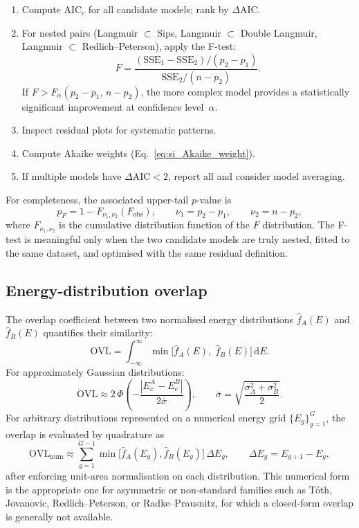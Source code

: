 \documentclass[journal=jacsat,manuscript=article]{achemso}
\begin{document}
\begin{enumerate}
	\item Compute AIC$_c$ for all candidate models; rank by $\Delta$AIC.
	\item For nested pairs (Langmuir $\subset$ Sips, Langmuir
	$\subset$ Double Langmuir, Langmuir $\subset$ Redlich--Peterson),
	apply the F-test:
	\begin{equation}
		F = \frac{(\mathrm{SSE}_1 - \mathrm{SSE}_2)/(p_2 - p_1)}
		{\mathrm{SSE}_2/(n - p_2)}.
		\label{eq:si_Ftest}
	\end{equation}
	If $F > F_{\alpha}(p_2 - p_1,\, n - p_2)$, the more complex model
	provides a statistically significant improvement at confidence
	level~$\alpha$.
	\item Inspect residual plots for systematic patterns.
	\item Compute Akaike weights (Eq.~\ref{eq:si_Akaike_weight}).
	\item If multiple models have $\Delta\mathrm{AIC} < 2$,
	report all and consider model averaging.
\end{enumerate}
For completeness, the associated upper-tail $p$-value is
\begin{equation}
	p_F
	=
	1 - F_{\nu_1,\nu_2}(F_{\mathrm{obs}}),
	\qquad
	\nu_1 = p_2 - p_1,
	\qquad
	\nu_2 = n - p_2,
	\label{eq:si_Ftest_pvalue}
\end{equation}
where $F_{\nu_1,\nu_2}$ is the cumulative distribution function of the
$F$ distribution. The F-test is meaningful only when the two candidate
models are truly nested, fitted to the same dataset, and optimised with
the same residual definition.

\subsection{Energy-distribution overlap}
\label{sec:si_OVL}

The overlap coefficient between two normalised energy distributions
$\hat{f}_A(E)$ and $\hat{f}_B(E)$ quantifies their similarity:
\begin{equation}
	\mathrm{OVL}
	= \int_{-\infty}^{\infty}
	\min\!\bigl[\hat{f}_A(E),\;\hat{f}_B(E)\bigr]\,\mathrm{d}E.
	\label{eq:si_OVL}
\end{equation}
For approximately Gaussian distributions:
\begin{equation}
	\mathrm{OVL}
	\approx 2\,\Phi\!\left(
	-\frac{|E_c^A - E_c^B|}{2\bar{\sigma}}\right),
	\qquad
	\bar{\sigma} = \sqrt{\frac{\sigma_A^2 + \sigma_B^2}{2}}.
	\label{eq:si_OVL_gauss}
\end{equation}
For arbitrary distributions represented on a numerical energy grid
$\{E_g\}_{g=1}^{G}$, the overlap is evaluated by quadrature as
\begin{equation}
	\mathrm{OVL}_{\mathrm{num}}
	\approx
	\sum_{g=1}^{G-1}
	\min\!\bigl[\hat{f}_A(E_g), \hat{f}_B(E_g)\bigr]\,
	\Delta E_g,
	\qquad
	\Delta E_g = E_{g+1}-E_g,
	\label{eq:si_OVL_num}
\end{equation}
after enforcing unit-area normalisation on each distribution. This
numerical form is the appropriate one for asymmetric or non-standard
families such as T\'{o}th, Jovanovic, Redlich--Peterson, or
Radke--Prausnitz, for which a closed-form overlap is generally not
available.
\end{document}
